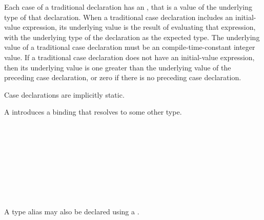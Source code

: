 Each case of a traditional  declaration has an , that is a value of the underlying type of that  declaration.
When a traditional case declaration includes an initial-value expression, its underlying value is the result of evaluating that expression, with the underlying type of the  declaration as the expected type.
The underlying value of a traditional case declaration must be an compile-time-constant integer value.
If a traditional case declaration does not have an initial-value expression, then its underlying value is one greater than the underlying value of the preceding case declaration, or zero if there is no preceding case declaration.

Case declarations are implicitly static.

%
%
%
%
%


A  introduces a binding that resolves to some other type.

\begin{Syntax}
     \\
        \SynOr {}

     \\
          \\
        \SynOpt \\
        \SynOpt \\
        \code{=}  \code{;}
\end{Syntax}

\begin{Checking}

 \\

\end{Checking}
    

\begin{Legacy}


A type alias may also be declared using a .

\begin{Syntax}
     \\
           \code{;}
        \SynOr {}
\end{Syntax}

\end{Legacy}


